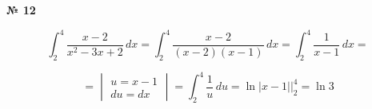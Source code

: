 \documentclass{article}
\begin{document}
\textbf{№ 12} 

\begingroup

\Large

$$ \int_{2}^{4} \frac{x-2}{x^2-3x+2} \,dx 
= \int_{2}^{4} \frac{x-2}{(x-2)(x-1)} \,dx 
= \int_{2}^{4} \frac{1}{x-1} \,dx 
= $$

$$ = \begin{vmatrix} u = x-1 \\ 
                    du = dx \end{vmatrix}
= \int_{2}^{4} \frac{1}{u} \,du 
= \ln{\left| x-1 \right|} \bigg\vert_{2}^{4}
= \ln{3} $$


\endgroup
\end{document}
